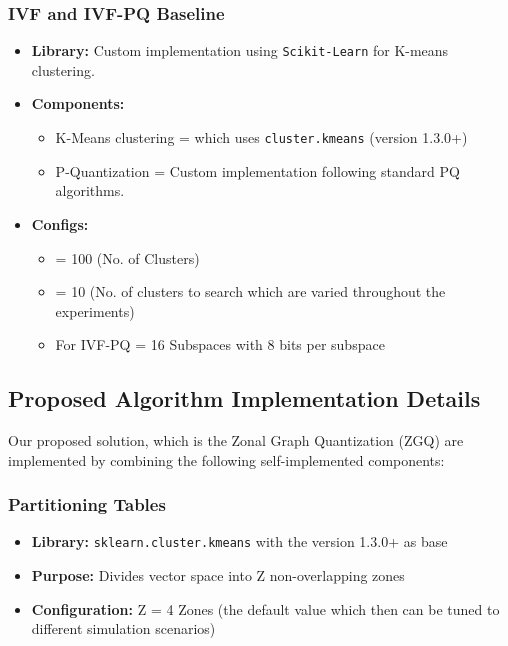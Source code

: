 \documentclass[conference]{IEEEtran}
\begin{document}
\subsubsection{IVF and IVF-PQ Baseline}
\begin{itemize}
    \item \textbf{Library:} Custom implementation using \texttt{Scikit-Learn} for K-means clustering.
    \item \textbf{Components:}
    \begin{itemize}
        \item[i.] K-Means clustering = which uses \texttt{cluster.kmeans} (version 1.3.0+)
        \item[ii.] P-Quantization = Custom implementation following standard PQ algorithms.
    \end{itemize}
    \item \textbf{Configs:}
    \begin{itemize}
        \item[i.] = 100 (No. of Clusters)
        \item[ii.] = 10 (No. of clusters to search which are varied throughout the experiments)
        \item[iii.] For IVF-PQ = 16 Subspaces with 8 bits per subspace
    \end{itemize}
\end{itemize}

\subsection{Proposed Algorithm Implementation Details}
Our proposed solution, which is the Zonal Graph Quantization (ZGQ) are implemented by combining the following self-implemented components:

\subsubsection{Partitioning Tables}
\begin{itemize}
    \item \textbf{Library:} \texttt{sklearn.cluster.kmeans} with the version 1.3.0+ as base
    \item \textbf{Purpose:} Divides vector space into Z non-overlapping zones
    \item \textbf{Configuration:} Z = 4 Zones (the default value which then can be tuned to different simulation scenarios)
\end{itemize}
\end{document}
